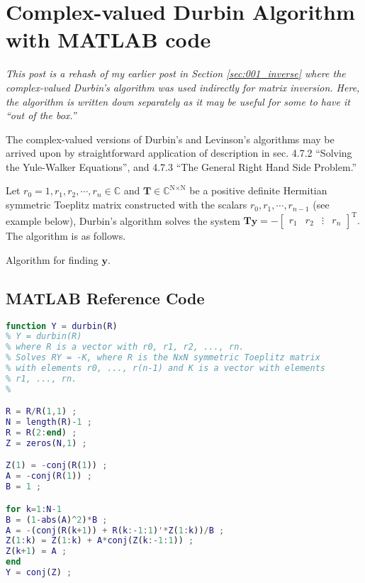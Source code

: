\section{Complex-valued Durbin Algorithm with MATLAB code}

\emph{This post is a rehash of my earlier post in Section \ref{sec:001_inverse} where the complex-valued Durbin's algorithm was used indirectly for matrix inversion. Here, the algorithm is written down separately as it may be useful for some to have it ``out of the box.''}

The complex-valued versions of Durbin's and Levinson's algorithms may be arrived upon by straightforward application of description in \cite{Golub2012} sec. 4.7.2 ``Solving the Yule-Walker Equations'', and 4.7.3 ``The General Right Hand Side Problem.''

Let $r_0 = 1, r_1, r_2, \cdots, r_n \in \mathbb{C}$ and $\boldsymbol{T} \in \mathbb{C}^{\text{N}\times\text{N}}$ be a positive definite Hermitian symmetric Toeplitz matrix constructed with the scalars $r_0, r_1, \cdots, r_{n-1}$ (see example below), Durbin's algorithm solves the system $\boldsymbol{T} \boldsymbol{y} = - \begin{bmatrix}r_1 & r_2 & \vdots & r_n\end{bmatrix}^\mathrm{T}.$ The algorithm is as follows.

\begin{algorithm}[H]
\caption{Algorithm for finding $\boldsymbol{y}.$}
\begin{algorithmic}[1]
\EndFor
{}
\end{algorithmic}
\end{algorithm}

\subsection{MATLAB Reference Code}
\begin{lstlisting}[language=MATLAB,numbers=none]
function Y = durbin(R)
% Y = durbin(R)
% where R is a vector with r0, r1, r2, ..., rn.
% Solves RY = -K, where R is the NxN symmetric Toeplitz matrix 
% with elements r0, ..., r(n-1) and K is a vector with elements
% r1, ..., rn.
%

R = R/R(1,1) ;
N = length(R)-1 ;
R = R(2:end) ;
Z = zeros(N,1) ;

Z(1) = -conj(R(1)) ;
A = -conj(R(1)) ;
B = 1 ;

for k=1:N-1
B = (1-abs(A)^2)*B ;
A = -(conj(R(k+1)) + R(k:-1:1)'*Z(1:k))/B ;
Z(1:k) = Z(1:k) + A*conj(Z(k:-1:1)) ;
Z(k+1) = A ;
end
Y = conj(Z) ;
\end{lstlisting}


